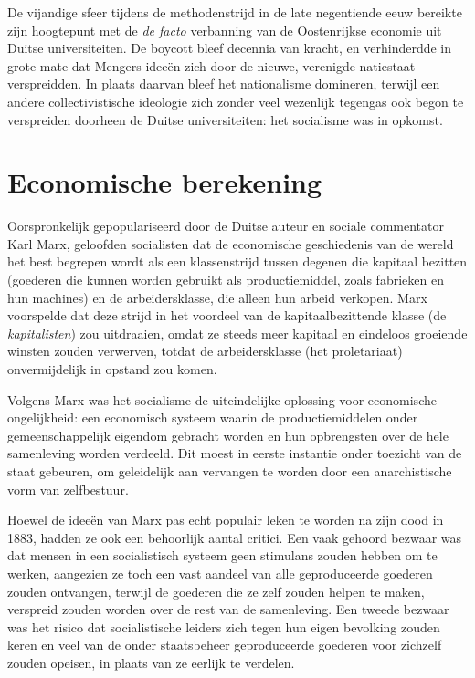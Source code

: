 \documentclass[
  a5paper,
  smalldemyvopaper,11pt,twoside,onecolumn,openright,extrafontsizes,
hidelinks]{memoir}
\begin{document}
De vijandige sfeer tijdens de methodenstrijd in de late negentiende eeuw
bereikte zijn hoogtepunt met de \emph{de facto} verbanning van de
Oostenrijkse economie uit Duitse universiteiten. De boycott bleef
decennia van kracht, en verhinderdde in grote mate dat Mengers ideeën
zich door de nieuwe, verenigde natiestaat verspreidden. In plaats
daarvan bleef het nationalisme domineren, terwijl een andere
collectivistische ideologie zich zonder veel wezenlijk tegengas ook
begon te verspreiden doorheen de Duitse universiteiten: het socialisme
was in opkomst.

\section{Economische berekening}\label{economische-berekening}

Oorspronkelijk gepopulariseerd door de Duitse auteur en sociale
commentator Karl Marx, geloofden socialisten dat de economische
geschiedenis van de wereld het best begrepen wordt als een klassenstrijd
tussen degenen die kapitaal bezitten (goederen die kunnen worden
gebruikt als productiemiddel, zoals fabrieken en hun machines) en de
arbeidersklasse, die alleen hun arbeid verkopen. Marx voorspelde dat
deze strijd in het voordeel van de kapitaalbezittende klasse (de
\emph{kapitalisten}) zou uitdraaien, omdat ze steeds meer kapitaal en
eindeloos groeiende winsten zouden verwerven, totdat de arbeidersklasse
(het proletariaat) onvermijdelijk in opstand zou komen.

Volgens Marx was het socialisme de uiteindelijke oplossing voor
economische ongelijkheid: een economisch systeem waarin de
productiemiddelen onder gemeenschappelijk eigendom gebracht worden en
hun opbrengsten over de hele samenleving worden verdeeld. Dit moest in
eerste instantie onder toezicht van de staat gebeuren, om geleidelijk
aan vervangen te worden door een anarchistische vorm van zelfbestuur.

Hoewel de ideeën van Marx pas echt populair leken te worden na zijn dood
in 1883, hadden ze ook een behoorlijk aantal critici. Een vaak gehoord
bezwaar was dat mensen in een socialistisch systeem geen stimulans
zouden hebben om te werken, aangezien ze toch een vast aandeel van alle
geproduceerde goederen zouden ontvangen, terwijl de goederen die ze zelf
zouden helpen te maken, verspreid zouden worden over de rest van de
samenleving. Een tweede bezwaar was het risico dat socialistische
leiders zich tegen hun eigen bevolking zouden keren en veel van de onder
staatsbeheer geproduceerde goederen voor zichzelf zouden opeisen, in
plaats van ze eerlijk te verdelen.
\end{document}
